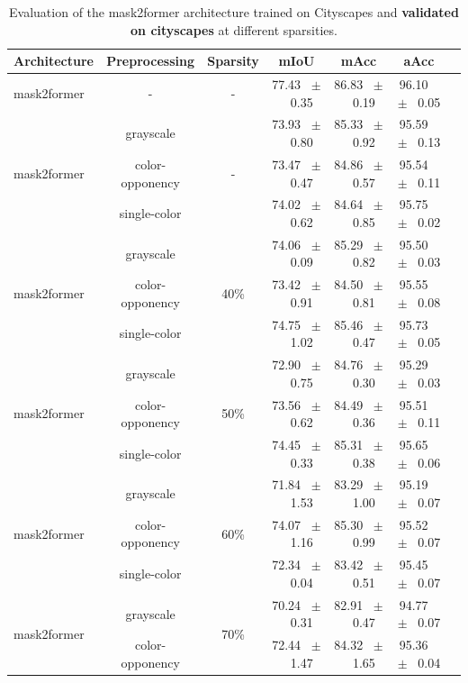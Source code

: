 \begin{table}[h]
  \centering
  \caption{Evaluation of the mask2former architecture trained on Cityscapes and \textbf{validated on cityscapes} at different sparsities.}
  \begin{tabular}{@{}lccc ccc@{}}
    \toprule
    Architecture & Preprocessing & Sparsity & mIoU & mAcc & aAcc \\
    \midrule
    mask2former & - & - & 77.43 ~$\pm$~ 0.35 & 86.83 ~$\pm$~ 0.19 & 96.10 ~$\pm$~ 0.05 \\
    \midrule
    \midrule
    \multirow{3}{*}{mask2former} & grayscale & \multirow{3}{*}{-} & 73.93 ~$\pm$~ 0.80 & 85.33 ~$\pm$~ 0.92 & 95.59 ~$\pm$~ 0.13 \\
    & color-opponency & & 73.47 ~$\pm$~ 0.47 & 84.86 ~$\pm$~ 0.57 & 95.54 ~$\pm$~ 0.11 \\
    & single-color & & 74.02 ~$\pm$~ 0.62 & 84.64 ~$\pm$~ 0.85 & 95.75 ~$\pm$~ 0.02 \\
    \midrule
    \multirow{3}{*}{mask2former} & grayscale & \multirow{3}{*}{40\%} & 74.06 ~$\pm$~ 0.09 & 85.29 ~$\pm$~ 0.82 & 95.50 ~$\pm$~ 0.03 \\
    & color-opponency & & 73.42 ~$\pm$~ 0.91 & 84.50 ~$\pm$~ 0.81 & 95.55 ~$\pm$~ 0.08 \\
    & single-color & & 74.75 ~$\pm$~ 1.02 & 85.46 ~$\pm$~ 0.47 & 95.73 ~$\pm$~ 0.05 \\
    \midrule
    \multirow{3}{*}{mask2former} & grayscale & \multirow{3}{*}{50\%} & 72.90 ~$\pm$~ 0.75 & 84.76 ~$\pm$~ 0.30 & 95.29 ~$\pm$~ 0.03 \\
    & color-opponency & & 73.56 ~$\pm$~ 0.62 & 84.49 ~$\pm$~ 0.36 & 95.51 ~$\pm$~ 0.11 \\
    & single-color & & 74.45 ~$\pm$~ 0.33 & 85.31 ~$\pm$~ 0.38 & 95.65 ~$\pm$~ 0.06 \\
    \midrule
    \multirow{3}{*}{mask2former} & grayscale & \multirow{3}{*}{60\%} & 71.84 ~$\pm$~ 1.53 & 83.29 ~$\pm$~ 1.00 & 95.19 ~$\pm$~ 0.07 \\
    & color-opponency & & 74.07 ~$\pm$~ 1.16 & 85.30 ~$\pm$~ 0.99 & 95.52 ~$\pm$~ 0.07 \\
    & single-color & & 72.34 ~$\pm$~ 0.04 & 83.42 ~$\pm$~ 0.51 & 95.45 ~$\pm$~ 0.07 \\
    \midrule
    \multirow{3}{*}{mask2former} & grayscale & \multirow{3}{*}{70\%} & 70.24 ~$\pm$~ 0.31 & 82.91 ~$\pm$~ 0.47 & 94.77 ~$\pm$~ 0.07 \\
    & color-opponency & & 72.44 ~$\pm$~ 1.47 & 84.32 ~$\pm$~ 1.65 & 95.36 ~$\pm$~ 0.04 \\

\end{tabular}
\end{table}
